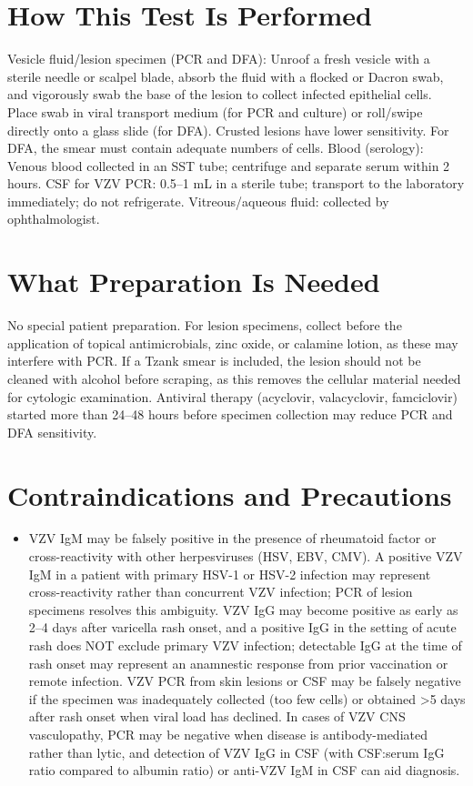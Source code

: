 \section*{How This Test Is Performed}
Vesicle fluid/lesion specimen (PCR and DFA): Unroof a fresh vesicle with a sterile needle or scalpel blade, absorb the fluid with a flocked or Dacron swab, and vigorously swab the base of the lesion to collect infected epithelial cells. Place swab in viral transport medium (for PCR and culture) or roll/swipe directly onto a glass slide (for DFA). Crusted lesions have lower sensitivity. For DFA, the smear must contain adequate numbers of cells. Blood (serology): Venous blood collected in an SST tube; centrifuge and separate serum within 2 hours. CSF for VZV PCR: 0.5--1 mL in a sterile tube; transport to the laboratory immediately; do not refrigerate. Vitreous/aqueous fluid: collected by ophthalmologist.

\section*{What Preparation Is Needed}
No special patient preparation. For lesion specimens, collect before the application of topical antimicrobials, zinc oxide, or calamine lotion, as these may interfere with PCR. If a Tzank smear is included, the lesion should not be cleaned with alcohol before scraping, as this removes the cellular material needed for cytologic examination. Antiviral therapy (acyclovir, valacyclovir, famciclovir) started more than 24--48 hours before specimen collection may reduce PCR and DFA sensitivity.

\section*{Contraindications and Precautions}
\begin{itemize}
  \item VZV IgM may be falsely positive in the presence of rheumatoid factor or cross-reactivity with other herpesviruses (HSV, EBV, CMV). A positive VZV IgM in a patient with primary HSV-1 or HSV-2 infection may represent cross-reactivity rather than concurrent VZV infection; PCR of lesion specimens resolves this ambiguity. VZV IgG may become positive as early as 2--4 days after varicella rash onset, and a positive IgG in the setting of acute rash does NOT exclude primary VZV infection; detectable IgG at the time of rash onset may represent an anamnestic response from prior vaccination or remote infection. VZV PCR from skin lesions or CSF may be falsely negative if the specimen was inadequately collected (too few cells) or obtained >5 days after rash onset when viral load has declined. In cases of VZV CNS vasculopathy, PCR may be negative when disease is antibody-mediated rather than lytic, and detection of VZV IgG in CSF (with CSF:serum IgG ratio compared to albumin ratio) or anti-VZV IgM in CSF can aid diagnosis.
\end{itemize}
